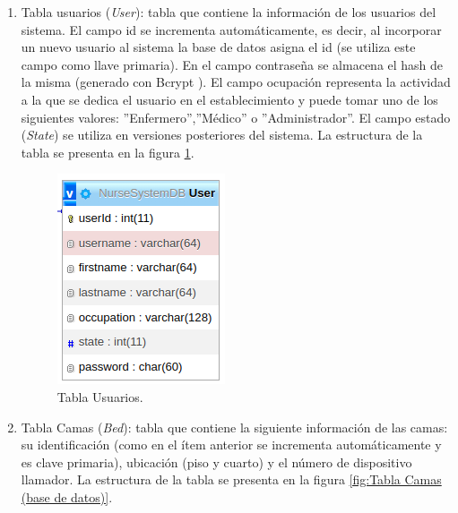 \begin{enumerate}

\item Tabla usuarios (\textit{User}): tabla que contiene la información de los usuarios del sistema. El campo id se incrementa automáticamente, es decir, al incorporar un nuevo usuario al sistema la base de datos asigna el id (se utiliza este campo como llave primaria). En el campo contraseña se almacena el hash de la misma (generado con Bcrypt \citep{WEBSITE:31}). El campo ocupación representa la actividad a la que se dedica el usuario en el establecimiento y puede tomar uno de los siguientes valores: ''Enfermero'',''Médico'' o ''Administrador''. El campo estado (\textit{State}) se utiliza en versiones posteriores del sistema. La estructura de la tabla se presenta en la figura \ref{fig:Tabla Usuarios (base de datos)}.

\begin{figure}[ht]
	\centering
	\includegraphics[scale=.70]{./Figures/dB(user).png}
	\caption{Tabla Usuarios.}
	\label{fig:Tabla Usuarios (base de datos)}
\end{figure}

\item Tabla Camas (\textit{Bed}): tabla que contiene la siguiente información de las camas: su identificación (como en el ítem anterior se incrementa automáticamente y es clave primaria), ubicación (piso y cuarto) y el número de dispositivo llamador. La estructura de la tabla se presenta en la figura \ref{fig:Tabla Camas (base de datos)}.


\end{enumerate}
